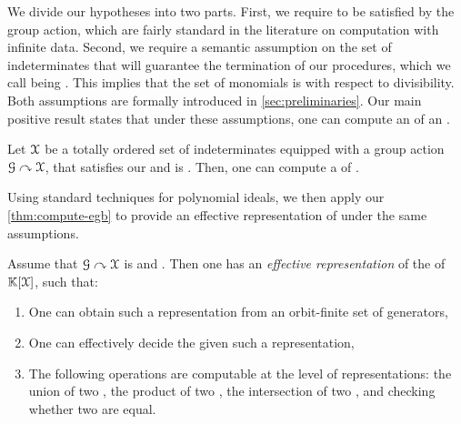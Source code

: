 \AP We divide our hypotheses into two parts. First, we require
 to be satisfied by the group action, which are
fairly standard in the literature on computation with infinite data. Second, we
require a semantic assumption on the set of indeterminates that will
guarantee the termination of our procedures, which we call being
. This implies that the set of monomials is
 with respect to divisibility. Both assumptions are
formally introduced in \cref{sec:preliminaries}. Our main positive result
states that under these assumptions, one can compute an  of an .

\begin{theorem}[name={Equivariant Gröbner Basis},restate=thm:compute-equiv-gb]
  \label{thm:compute-egb}
  Let $\mathcal{X}$ be a totally ordered set of indeterminates
  equipped with a group action $\mathcal{G} \curvearrowright \mathcal{X}$, that satisfies our 
  and is .
  Then, one can
  compute a  of .
\end{theorem}


Using standard techniques for polynomial ideals, we then apply our
\cref{thm:compute-egb} to provide an effective representation of
 under the same assumptions.

\begin{corollary}[name={},restate=cor:equivariant-ideals-computations]
  \label{cor:equivariant-ideals-computations}
  Assume that $\mathcal{G} \curvearrowright \mathcal{X}$
  is 
  and .
  Then one has an \emph{effective representation} of
  the  of $\mathbb{K}[\mathcal{X}]$,
  such that:
  \begin{enumerate}
    \item One can obtain such a representation from an orbit-finite set of generators,
    \item One can effectively decide the 
      given such a representation,
    \item The following operations are computable at the level of representations:
      the union of two , 
      the product of two ,
      the intersection of two ,
      and checking whether two  are equal.
  \end{enumerate}
\end{corollary}


